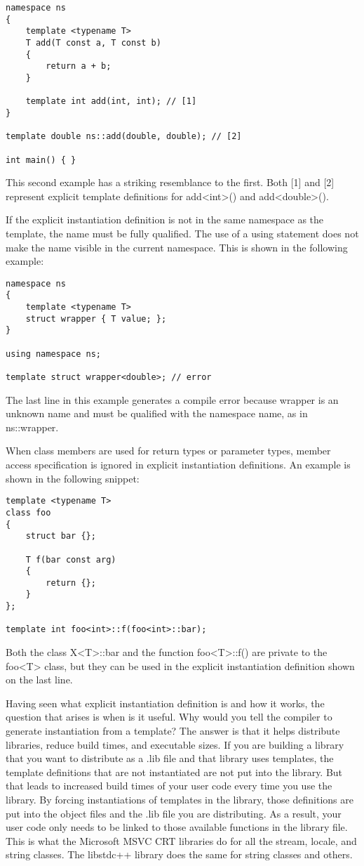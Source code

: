 \begin{lstlisting}[style=styleCXX]
namespace ns
{
	template <typename T>
	T add(T const a, T const b)
	{
		return a + b;
	}

	template int add(int, int); // [1]
}

template double ns::add(double, double); // [2]

int main() { }
\end{lstlisting}

This second example has a striking resemblance to the first. Both [1] and [2] represent explicit template definitions for add<int>() and add<double>().

If the explicit instantiation definition is not in the same namespace as the template, the name must be fully qualified. The use of a using statement does not make the name visible in the current namespace. This is shown in the following example:

\begin{lstlisting}[style=styleCXX]
namespace ns
{
	template <typename T>
	struct wrapper { T value; };
}

using namespace ns;

template struct wrapper<double>; // error
\end{lstlisting}

The last line in this example generates a compile error because wrapper is an unknown name and must be qualified with the namespace name, as in ns::wrapper.

When class members are used for return types or parameter types, member access specification is ignored in explicit instantiation definitions. An example is shown in the following snippet:

\begin{lstlisting}[style=styleCXX]
template <typename T>
class foo
{
	struct bar {};
	
	T f(bar const arg)
	{
		return {};
	}
};

template int foo<int>::f(foo<int>::bar);
\end{lstlisting}

Both the class X<T>::bar and the function foo<T>::f() are private to the foo<T> class, but they can be used in the explicit instantiation definition shown on the last line.

Having seen what explicit instantiation definition is and how it works, the question that arises is when is it useful. Why would you tell the compiler to generate instantiation from a template? The answer is that it helps distribute libraries, reduce build times, and executable sizes. If you are building a library that you want to distribute as a .lib file and that library uses templates, the template definitions that are not instantiated are not put into the library. But that leads to increased build times of your user code every time you use the library. By forcing instantiations of templates in the library, those definitions are put into the object files and the .lib file you are distributing. As a result, your user code only needs to be linked to those available functions in the library file. This is what the Microsoft MSVC CRT libraries do for all the stream, locale, and string classes. The libstdc++ library does the same for string classes and others.

